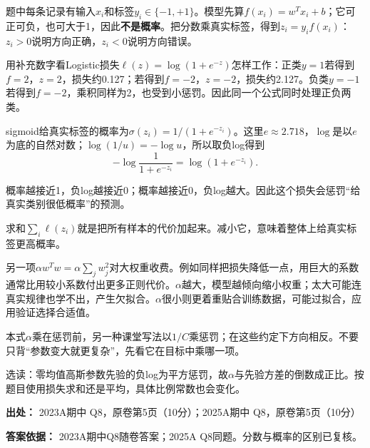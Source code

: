题中每条记录有输入\(x_i\)和标签\(y_i\in\{-1,+1\}\)。模型先算\(f(x_i)=w^Tx_i+b\)；它可正可负，也可大于1，因此\textbf{不是概率}。把分数乘真实标签，得到\(z_i=y_if(x_i)\)：\(z_i>0\)说明方向正确，\(z_i<0\)说明方向错误。


用补充数字看Logistic损失\(\ell(z)=\log(1+e^{-z})\)怎样工作：正类\(y=1\)若得到\(f=2\)，\(z=2\)，损失约0.127；若得到\(f=-2\)，\(z=-2\)，损失约2.127。负类\(y=-1\)若得到\(f=-2\)，乘积同样为2，也受到小惩罚。因此同一个公式同时处理正负两类。


sigmoid给真实标签的概率为\(\sigma(z_i)=1/(1+e^{-z_i})\)。这里\(e\approx2.718\)，\(\log\)是以\(e\)为底的自然对数；\(\log(1/u)=-\log u\)，所以取负log得到
\[
-\log\frac{1}{1+e^{-z_i}}=\log(1+e^{-z_i}).
\]


概率越接近1，负log越接近0；概率越接近0，负log越大。因此这个损失会惩罚“给真实类别很低概率”的预测。


求和\(\sum_i\ell(z_i)\)就是把所有样本的代价加起来。减小它，意味着整体上给真实标签更高概率。


另一项\(\alpha w^Tw=\alpha\sum_jw_j^2\)对大权重收费。例如同样把损失降低一点，用巨大的系数通常比用较小系数付出更多正则代价。\(\alpha\)越大，模型越倾向缩小权重；太大可能连真实规律也学不出，产生欠拟合。\(\alpha\)很小则更着重贴合训练数据，可能过拟合，应用验证选择合适值。


本式\(\alpha\)乘在惩罚前，另一种课堂写法以\(1/C\)乘惩罚；在这些约定下方向相反。不要只背“参数变大就更复杂”，先看它在目标中乘哪一项。


选读：零均值高斯参数先验的负log为平方惩罚，故\(\alpha\)与先验方差的倒数成正比。按题目使用损失求和还是平均，具体比例常数也会变化。


\textbf{出处：} 2023A期中 Q8，原卷第5页（10分）；2025A期中 Q8，原卷第5页（10分）


\textbf{答案依据：} 2023A期中Q8随卷答案；2025A Q8同题。分数与概率的区别已复核。
